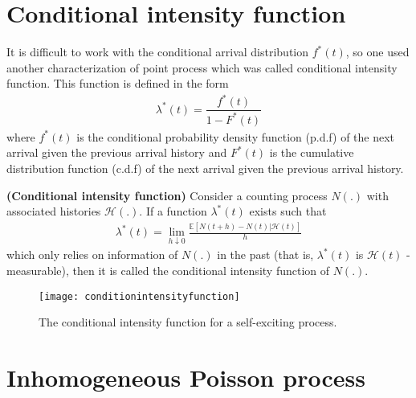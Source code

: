 \section{Conditional intensity function}
It is difficult to work with the conditional arrival distribution $f^*(t)$, so one used another characterization of point process which was called conditional intensity function. This function is defined in the form
\begin{align*}
	\lambda^*(t)=\dfrac{f^*(t)}{1-F^*(t)}
\end{align*}
where $f^*(t)$ is the conditional probability density function (p.d.f) of the next arrival given the previous arrival history and $F^*(t)$ is the cumulative distribution function (c.d.f) of the next arrival given the previous arrival history.
\begin{definition}
	\label{def:cif}
	\cite{hawkes} \textbf{(Conditional intensity function)} Consider a counting process $N(.)$ with associated histories $\mathcal{H(.)}$. If a function $\lambda^*(t)$ exists such that
	\begin{align*}
		\lambda^*(t) = \lim_{h\downarrow 0} \frac{\mathbb{E}[N(t + h) - N(t)|\mathcal{H}(t)]}{h}
	\end{align*}
	which only relies on information of $N(.)$  in the past (that is, $\lambda^*(t)$ is $\mathcal{H}(t)$ - measurable), then it is called the conditional intensity function of $N(.)$.
\end{definition}
\begin{figure}[H]
	\centering
	\texttt{[image: conditionintensityfunction]}
	\caption[The conditional intensity function for a self-exciting process.]{The conditional intensity function for a self-exciting process.}
\end{figure}
\section{Inhomogeneous Poisson process}
